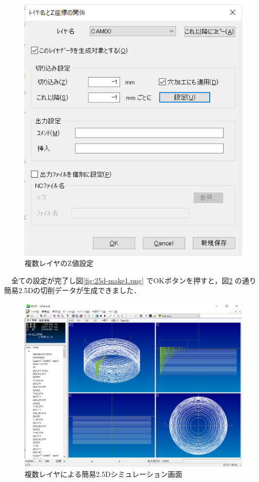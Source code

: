 \begin{minipage}{0.5\textwidth}
\begin{figure}[H]
\centering
\includegraphics[scale=0.7]{No3/fig/25d-make2.png}
\caption{複数レイヤのZ値設定}
\label{fig:25d-make2.png}
\end{figure}
\end{minipage}

\vspace*{2zh}
　全ての設定が完了し図\ref{fig:25d-make1.png} でOKボタンを押すと，図\ref{fig:25d.png} の通り簡易2.5Dの切削データが生成できました．

\begin{figure}[H]
\centering
\includegraphics[scale=0.55]{No3/fig/25d.png}
\caption{複数レイヤによる簡易2.5Dシミュレーション画面}
\label{fig:25d.png}
\end{figure}
